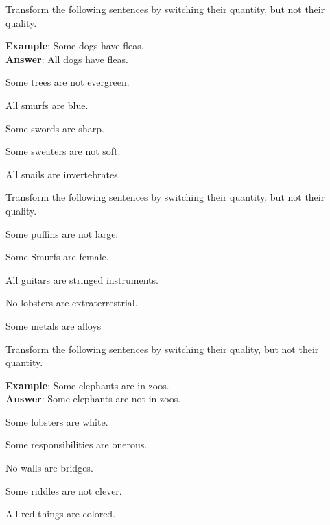 \noindent\problempart Transform the following sentences by switching their quantity, but not their quality.

\textbf{Example}: Some dogs have fleas. \\
\textbf{Answer}: All dogs have fleas.

\begin{exercises}
\item Some trees are not evergreen. 
\item All smurfs are blue. 
\item Some swords are sharp. 
\item Some sweaters are not soft. 
\item All snails are invertebrates. 
\end{exercises}

\noindent\problempart Transform the following sentences by switching their quantity, but not their quality.

\begin{exercises}
\item Some puffins are not large. 
\item Some Smurfs are female.
\item All guitars are stringed instruments. 
\item No lobsters are extraterrestrial.
\item Some metals are alloys 
\end{exercises}

\noindent\problempart Transform the following sentences by switching their quality, but not their quantity.

\textbf{Example}: Some elephants are in zoos. \\
\textbf{Answer}: Some elephants are not in zoos. 

\begin{exercises}
\item Some lobsters are white. 

\item Some responsibilities are onerous. 

\item No walls are bridges. 

\item Some riddles are not clever.
 
\item All red things are colored. 
\end{exercises}

